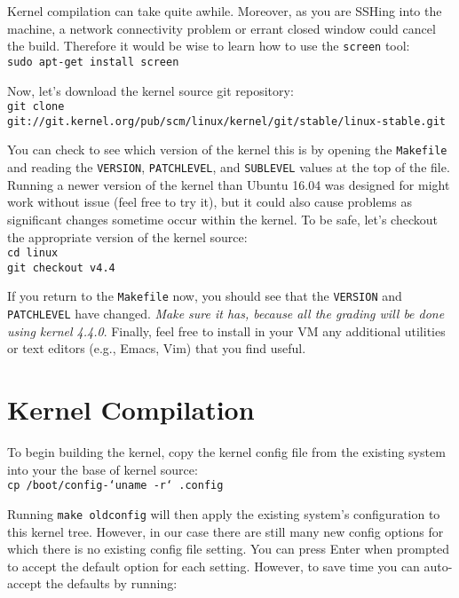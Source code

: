 \documentclass[10pt]{article}
\begin{document}
Kernel compilation can take quite awhile. Moreover, as you are SSHing into the machine, a network connectivity problem or errant closed window could cancel the build. Therefore  it would be wise to learn how to use the {\tt screen} tool:\\

\noindent
{\footnotesize
{\tt sudo apt-get install screen}\\
}

Now, let's download the kernel source git repository:\\

\noindent
{\footnotesize
{\tt git clone \\git://git.kernel.org/pub/scm/linux/kernel/git/stable/linux-stable.git}\\
}

You can check to see which version of the kernel this is by opening the {\tt Makefile} and reading the {\tt VERSION}, {\tt PATCHLEVEL}, and {\tt SUBLEVEL} values at the top of the file. Running a newer version of the kernel than Ubuntu 16.04 was designed for might work without issue (feel free to try it), but it could also cause problems as significant changes sometime occur within the kernel. To be safe, let's checkout the appropriate version of the kernel source:\\

\noindent
{\footnotesize
{\tt cd linux}\\ \noindent
{\tt git checkout v4.4}\\
}

If you return to the {\tt Makefile} now, you should see that the {\tt VERSION} and {\tt PATCH\-LEVEL} have changed. 
{\it Make sure it has, because all the grading will be done using kernel 4.4.0}. 
Finally, feel free to install in your VM any additional utilities or text editors (e.g., Emacs, Vim) that you find useful.

\section{Kernel Compilation}

To begin building the kernel, copy the kernel config file from the existing system into your the base of kernel source:\\

\noindent
{\footnotesize
{\tt cp /boot/config-`uname -r` .config}\\
}

Running {\tt make oldconfig} will then apply the existing system's configuration to this kernel tree. However, in our case there are still many new config options for which there is no existing config file setting. You can press Enter when prompted to accept the default option for each setting. However, to save time you can auto-accept the defaults by running:\\
\end{document}
